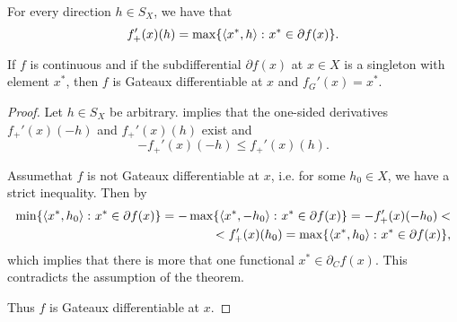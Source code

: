 \begin{proposition}
  \label{thm:convex_one_sided_derivative_is_max}
  For every direction \( h \in S_X \), we have that
  \begin{equation*}
    f_+'(x)(h) = \max\{ \left\langle x^*, h \right\rangle \colon x^* \in \partial f(x) \}.
  \end{equation*}
\end{proposition}

\begin{theorem}\label{thm:singleton_subdifferential_implies_gateaux}
  If \( f \) is continuous and if the subdifferential \( \partial f(x) \) at \( x \in X \) is a singleton with element \( x^* \), then \( f \) is Gateaux differentiable at \( x \) and \( f_G'(x) = x^* \).
\end{theorem}
\begin{proof}
  Let \( h \in S_X \) be arbitrary.  implies that the one-sided derivatives \( f_+'(x)(-h) \) and \( f_+'(x)(h) \) exist and
  \begin{equation*}
    -f_+'(x)(-h) \leq f_+'(x)(h).
  \end{equation*}

  Assume\LEM that \( f \) is not Gateaux differentiable at \( x \), i.e. for some \( h_0 \in X \), we have a strict inequality. Then by 
  \begin{align*}
    \min\{ \left\langle x^*, h_0 \right\rangle \colon x^* \in \partial f(x) \}
    =
    -\max\{ \left\langle x^*, -h_0 \right\rangle \colon x^* \in \partial f(x) \}
    =
    -f_+'(x)(-h_0)
    < \\ <
    f_+'(x)(h_0)
    =
    \max\{ \left\langle x^*, h_0 \right\rangle \colon x^* \in \partial f(x) \},
  \end{align*}
  which implies that there is more that one functional \( x^* \in \partial_C f(x) \). This contradicts the assumption of the theorem.

  Thus \( f \) is Gateaux differentiable at \( x \).
\end{proof}

